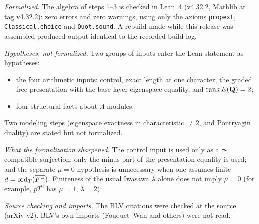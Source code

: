 \begin{remark}\label{rem:a3check}
\emph{Formalized.} The algebra of steps 1--3 is checked in Lean~4 (v4.32.2, Mathlib at tag v4.32.2): zero errors and zero warnings, using only the axioms \texttt{propext}, \texttt{Classical.choice} and \texttt{Quot.sound}. A rebuild made while this release was assembled produced output identical to the recorded build log.

\emph{Hypotheses, not formalized.} Two groups of inputs enter the Lean statement as hypotheses:
\begin{itemize}[leftmargin=*]
\item the four arithmetic inputs: control, exact length at one character, the graded free presentation with the base-layer eigenspace equality, and $\operatorname{rank} E(\mathbf{Q})=2$;
\item four structural facts about $\Lambda$-modules.
\end{itemize}
Two modeling steps (eigenspace exactness in characteristic $\neq2$, and Pontryagin duality) are stated but not formalized.

\emph{What the formalization sharpened.} The control input is used only as a $\tau$-compatible surjection; only the minus part of the presentation equality is used; and the separate $\mu=0$ hypothesis is unnecessary when one assumes finite $d=\operatorname{ord}_T(\overline{F^-})$. Finiteness of the usual Iwasawa $\lambda$ alone does not imply $\mu=0$ (for example, $pT^2$ has $\mu=1$, $\lambda=2$).

\emph{Source checking and imports.} The BLV citations were checked at the source (arXiv v2). BLV's own imports (Fouquet--Wan and others) were not read.
\end{remark}

